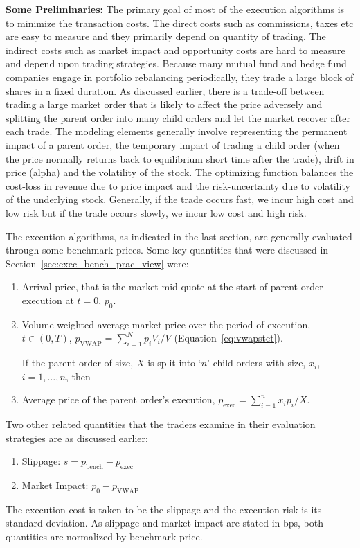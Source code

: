 \noindent\textbf{Some Preliminaries:} The primary goal of most of the execution algorithms is to minimize the transaction costs. The direct costs such as commissions, taxes etc are easy to measure and they primarily depend on quantity of trading. The indirect costs such as market impact and opportunity costs are hard to measure and depend upon trading strategies. Because many mutual fund and hedge fund companies engage in portfolio rebalancing periodically, they trade a large block of shares in a fixed duration. As discussed earlier, there is a trade-off between trading a large market order that is likely to affect the price adversely and splitting the parent order into many child orders and let the market recover after each trade. The modeling elements generally involve representing the permanent impact of a parent order, the temporary impact of trading a child order (when the price normally returns back to equilibrium short time after the trade), drift in price (alpha) and the volatility of the stock. The optimizing function balances the cost-loss in revenue due to price impact and the risk-uncertainty due to volatility of the underlying stock. Generally, if the trade occurs fast, we incur high cost and low risk but if the trade occurs slowly, we incur low cost and high risk.


The execution algorithms, as indicated in the last section, are generally evaluated through some benchmark prices. Some key quantities that were discussed in Section~\ref{sec:exec_bench_prac_view} were:
	\begin{enumerate}[--]
	\item Arrival price, that is the market mid-quote at the start of parent order execution at $t= 0$, $p_0$.
	\item Volume weighted average market price over the period of execution, $t \in (0,T)$, $p_{\text{VWAP}}= \sum_{i=1}^N p_iV_i/V$ (Equation~\ref{eq:vwapstet}). \twomedskip
	
	If the parent order of size, $X$ is split into `$n$' child orders with size, $x_i$, $i=1,\ldots,n$, then
	\item Average price of the parent order's execution, $p_{\text{exec}}= \sum_{i=1}^n x_ip_i/X$. 
	\end{enumerate}
	
Two other related quantities that the traders examine in their evaluation strategies are as discussed earlier:
	\begin{enumerate}[--]
	\item Slippage: $s= p_{\text{bench}} - p_{\text{exec}}$ \label{in:slippage}
	\item Market Impact: $p_0 - p_{\text{VWAP}}$
	\end{enumerate}
The execution cost is taken to be the slippage and the execution risk is its standard deviation. As slippage and market impact are stated in bps, both quantities are normalized by benchmark price. 


